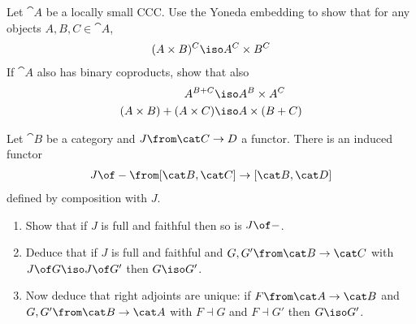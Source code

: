 \begin{exercise}
  Let $\cat A$ be a locally small CCC. Use the Yoneda embedding to show that for any objects $A,B,C\in\cat A$,
  \begin{align*}
    (A\times B)^C\iso A^C\times B^C
  \end{align*}
  If $\cat A$ also has binary coproducts, show that also
  \begin{align*}
    A^{B+C}&\iso A^B\times A^C\\
    (A\times B)+(A\times C)&\iso A\times (B+C)
  \end{align*}
\end{exercise}

\begin{exercise}
  Let $\cat B$ be a category and $J\from\cat C\to D$ a functor. There is an induced functor
  \begin{align*}
    J\of -\from[\cat B,\cat C]\to [\cat B,\cat D]
  \end{align*}
  defined by composition with $J$.
  \begin{enumerate}
  \item Show that if $J$ is full and faithful then so is $J\of -$.
  \item Deduce that if $J$ is full and faithful and $G,G'\from\cat B\to\cat C$ with $J\of G\iso J\of G'$ then $G\iso G'$.
  \item Now deduce that right adjoints are unique: if $F\from \cat A\to\cat B$ and $G,G'\from\cat B\to \cat A$ with $F\dashv G$ and $F\dashv G'$ then $G\iso G'$. 
  \end{enumerate}
\end{exercise}


